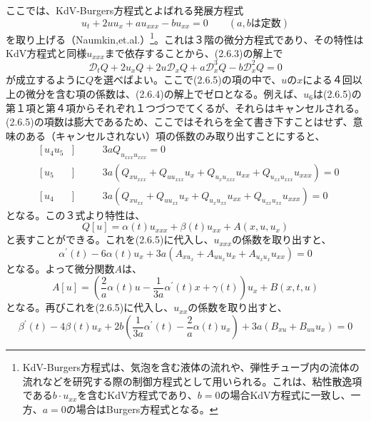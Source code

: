 \documentclass[a4paper, 11pt]{report}
\theoremstyle{definition}
\begin{document}
 ここでは、KdV-Burgers方程式とよばれる発展方程式
\begin{equation}
u_t + 2uu_x + a u_{xxx} - b u_{xx} = 0 \qquad (a, b \text{は定数})  %
\end{equation}
を取り上げる（Naumkin,et.al.\cite{Naumkin}）\footnote{KdV-Burgers方程式は、気泡を含む液体の流れや、弾性チューブ内の流体の流れなどを研究する際の制御方程式として用いられる。これは、粘性散逸項である$b\cdot u_{xx}$を含むKdV方程式であり、$b=0$の場合KdV方程式に一致し、一方、$a=0$の場合はBurgers方程式となる。}。これは３階の微分方程式であり、その特性はKdV方程式と同様$u_{xxx}$まで依存することから、(2.6.3)の解上で
\begin{equation}
\mathcal{D}_tQ + 2u_xQ + 2u\mathcal{D}_xQ + a \mathcal{D}_x^3Q - b \mathcal{D}_x^2Q = 0  %
\end{equation}
が成立するように$Q$を選べばよい。ここで(2.6.5)の項の中で、$u$の$x$による４回以上の微分を含む項の係数は、(2.6.4)の解上でゼロとなる。例えば、$u_6$は(2.6.5)の第１項と第４項からそれぞれ１つづつでてくるが、それらはキャンセルされる。(2.6.5)の項数は膨大であるため、ここではそれらを全て書き下すことはせず、意味のある（キャンセルされない）項の係数のみ取り出すことにすると、
\begin{align*}
&[\, u_4u_5 &]\qquad &3a Q_{u_{xxx}u_{xxx}} = 0\\
&[\, u_5    &]\qquad &3a (Q_{xu_{xxx}}+Q_{uu_{xxx}}u_{x}+Q_{u_{x}u_{xxx}}u_{xx}+Q_{u_{xx}u_{xxx}}u_{xxx}) = 0\\
&[\, u_4    &]\qquad &3a (Q_{xu_{xx}}+Q_{uu_{xx}}u_{x}+Q_{u_{x}u_{xx}}u_{xx}+Q_{u_{xx}u_{xx}}u_{xxx}) = 0
\end{align*}
となる。この３式より特性は、
\begin{equation*}
Q[u] = \alpha (t)u_{xxx} + \beta (t)u_{xx} + A(x, u, u_{x})
\end{equation*}
と表すことができる。これを(2.6.5)に代入し、$u_{xxx}$の係数を取り出すと、
\begin{equation*}
\alpha ^{'}(t) - 6\alpha (t)u_{x} + 3a (A_{xu_{x}}+A_{uu_{x}}u_{x}+A_{u_{x}u_{x}}u_{xx}) = 0
\end{equation*}
となる。よって微分関数$A$は、
\begin{equation*}
A[u] = (\frac{2}{a}\alpha (t)u-\frac{1}{3a}\alpha ^{'}(t)x+ \gamma (t))u_{x} + B(x, t, u)
\end{equation*}
となる。再びこれを(2.6.5)に代入し、$u_{xx}$の係数を取り出すと、
\begin{equation*}
\beta ^{'}(t) - 4\beta (t)u_{x} + 2b(\frac{1}{3a}\alpha ^{'}(t) - \frac{2}{a} \alpha (t)u_{x}) + 3a (B_{xu}+B_{uu}u_{x}) = 0
\end{equation*}
\end{document}

